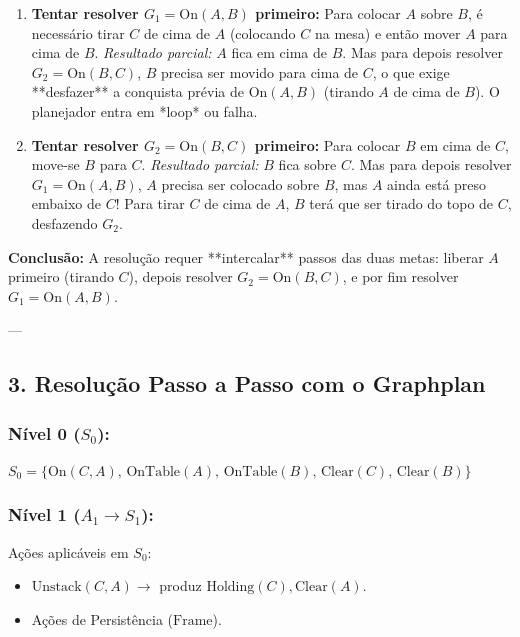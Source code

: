 \documentclass[a4paper,12pt]{article}
\begin{document}
\begin{enumerate}
	\item \textbf{Tentar resolver $G_1 = \text{On}(A, B)$ primeiro:}
	Para colocar $A$ sobre $B$, é necessário tirar $C$ de cima de $A$ (colocando $C$ na mesa) e então mover $A$ para cima de $B$. 
	\textit{Resultado parcial:} $A$ fica em cima de $B$. Mas para depois resolver $G_2 = \text{On}(B, C)$, $B$ precisa ser movido para cima de $C$, o que exige **desfazer** a conquista prévia de $\text{On}(A, B)$ (tirando $A$ de cima de $B$). O planejador entra em *loop* ou falha.
	
	\item \textbf{Tentar resolver $G_2 = \text{On}(B, C)$ primeiro:}
	Para colocar $B$ em cima de $C$, move-se $B$ para $C$. 
	\textit{Resultado parcial:} $B$ fica sobre $C$. Mas para depois resolver $G_1 = \text{On}(A, B)$, $A$ precisa ser colocado sobre $B$, mas $A$ ainda está preso embaixo de $C$! Para tirar $C$ de cima de $A$, $B$ terá que ser tirado do topo de $C$, desfazendo $G_2$.
\end{enumerate}

\textbf{Conclusão:} A resolução requer **intercalar** passos das duas metas: liberar $A$ primeiro (tirando $C$), depois resolver $G_2 = \text{On}(B, C)$, e por fim resolver $G_1 = \text{On}(A, B)$.

---

\subsection*{3. Resolução Passo a Passo com o Graphplan}

\subsubsection*{Nível 0 ($S_0$):}
$S_0 = \{ \text{On}(C, A), \, \text{OnTable}(A), \, \text{OnTable}(B), \, \text{Clear}(C), \, \text{Clear}(B) \}$

\subsubsection*{Nível 1 ($A_1 \to S_1$):}
Ações aplicáveis em $S_0$:
\begin{itemize}
	\item $\text{Unstack}(C, A) \to$ produz $\text{Holding}(C), \text{Clear}(A)$.
	\item Ações de Persistência ($\text{Frame}$).
\end{itemize}
\end{document}
